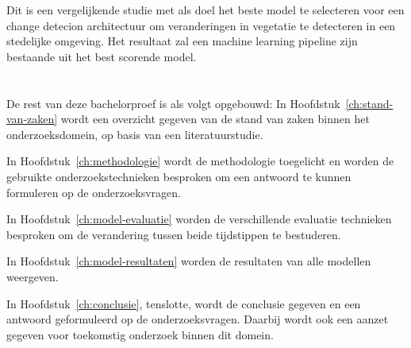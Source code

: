 Dit is een vergelijkende studie met als doel het beste model te selecteren voor een change detecion architectuur om veranderingen in
vegetatie te detecteren in een stedelijke omgeving. Het resultaat zal een machine learning pipeline zijn bestaande uit het best 
scorende model. 
\newline

\section{}%
\label{sec:opzet-bachelorproef}


De rest van deze bachelorproef is als volgt opgebouwd:
\newline
\newline
In Hoofdstuk~\ref{ch:stand-van-zaken} wordt een overzicht gegeven van de stand van zaken binnen het onderzoeksdomein, op basis van een literatuurstudie.

In Hoofdstuk~\ref{ch:methodologie} wordt de methodologie toegelicht en worden de gebruikte onderzoekstechnieken besproken om een antwoord te kunnen formuleren op de onderzoeksvragen.

In Hoofdstuk~\ref{ch:model-evaluatie} worden de verschillende evaluatie technieken besproken om de verandering tussen beide tijdstippen te bestuderen. 

In Hoofdstuk~\ref{ch:model-resultaten} worden de resultaten van alle modellen weergeven.


In Hoofdstuk~\ref{ch:conclusie}, tenslotte, wordt de conclusie gegeven en een antwoord geformuleerd op de onderzoeksvragen. Daarbij wordt ook een aanzet gegeven voor toekomstig onderzoek binnen dit domein.